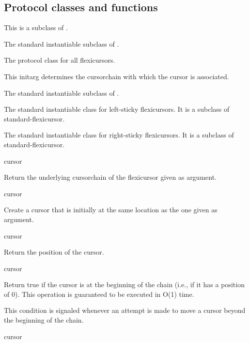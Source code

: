 \documentclass[11pt]{article}
\begin{document}
\subsection{Protocol classes and functions}


This is a subclass of .


The standard instantiable subclass of .


The protocol class for all flexicursors.


This initarg determines the cursorchain with which the cursor is associated. 


The standard instantiable subclass of . 


The standard instantiable class for left-sticky flexicursors.  It is a
subclass of standard-flexicursor. 


The standard instantiable class for right-sticky flexicursors.  It is a
subclass of standard-flexicursor. 

 {cursor}

Return the underlying cursorchain of the flexicursor given
as argument. 

 {cursor}

Create a cursor that is initially at the same location as the one
given as argument.  

 {cursor}

Return the position of the cursor.

 {cursor}

Return true if the cursor is at the beginning of the chain (i.e., if
it has a position of 0).  This operation is guaranteed to be executed
in O(1) time. 


This condition is signaled whenever an attempt is made to move a
cursor beyond the beginning of the chain. 

 {cursor}
\end{document}
